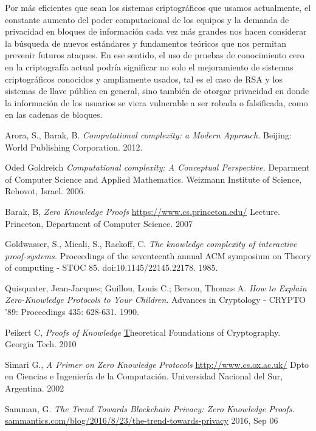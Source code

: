 \documentclass[oneside,10pt]{article}
\begin{document}
Por más eficientes que sean los sistemas criptográficos que usamos actualmente, el constante aumento del poder computacional de los equipos y la demanda de privacidad en bloques de información cada vez más grandes nos hacen considerar la búsqueda de nuevos estándares y fundamentos teóricos que nos permitan prevenir futuros ataques.  En ese sentido, el uso de pruebas de conocimiento cero en la criptografía actual podría significar no solo el mejoramiento de sistemas criptográficos conocidos y ampliamente usados, tal es el caso de RSA y los sistemas de llave pública en general, sino también de otorgar privacidad en donde la información de los usuarios se viera vulnerable a ser robada o falsificada, como en las cadenas de bloques. 
\begin{thebibliography}{99}

  Arora, S.,  Barak, B. 
  \emph{Computational complexity: a Modern Approach.}
  Beijing: World Publishing Corporation.
  2012.

  Oded Goldreich
  \emph{Computational complexity: A Conceptual Perspective.}
  Deparment of Computer Science and Applied Mathematics.
  Weizmann Institute of Science, Rehovot, Israel.
  2006.
  
  Barak, B,
  \emph{Zero Knowledge Proofs}
  \href{https://www.cs.princeton.edu/courses/archive/fall07/cos433/lec15.pdf}
       {https://www.cs.princeton.edu/}
       Lecture.
       Princeton, Department of Computer Science.
       2007

  Goldwasser, S., Micali, S.,  Rackoff, C.
  \emph{The knowledge complexity of interactive proof-systems.}
  Proceedings of the seventeenth annual ACM symposium on Theory of computing - STOC 85.
  doi:10.1145/22145.22178.
  1985.

  Quisquater, Jean-Jacques; Guillou, Louis C.; Berson, Thomas A.
  \emph{How to Explain Zero-Knowledge Protocols to Your Children}.
  Advances in Cryptology - CRYPTO '89:
  Proceedings 435: 628-631.
  1990.

  Peikert C,
  \emph{Proofs of Knowledge}
  \href{https://wiki.cc.gatech.edu/theory/images/5/54/Lec18.pdf}
  Theoretical Foundations of Cryptography.
  Georgia Tech.
  2010

  Simari G.,
  \emph{A Primer on Zero Knowledge Protocols}
  \href{http://www.cs.ox.ac.uk/people/gerardo.simari/personal/publications/zkp-simari2002.pdf}
  {http://www.cs.ox.ac.uk/}
  Dpto en Ciencias e Ingeniería de la Computación.
  Universidad Nacional del Sur, Argentina.
  2002
  
  Samman, G.
  \emph{The Trend Towards Blockchain Privacy: Zero Knowledge Proofs.}
  \href{http://sammantics.com/blog/2016/8/23/the-trend-towards-privacy-how-blockchains-plan-to-accomplish-this}
  {sammantics.com/blog/2016/8/23/the-trend-towards-privacy}
  2016, Sep 06

\end{thebibliography}
\end{document}
